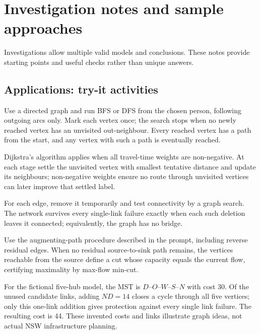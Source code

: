\chapter*{Investigation notes and sample approaches}
Investigations allow multiple valid models and conclusions. These notes provide starting points and useful checks rather than unique answers.

\section*{Applications: try-it activities}
\begin{description}[style=nextline]
\item[Social networks] Use a directed graph and run BFS or DFS from the chosen person, following outgoing arcs only. Mark each vertex once; the search stops when no newly reached vertex has an unvisited out-neighbour. Every reached vertex has a path from the start, and any vertex with such a path is eventually reached.
\item[Transport networks] Dijkstra's algorithm applies when all travel-time weights are non-negative. At each stage settle the unvisited vertex with smallest tentative distance and update its neighbours; non-negative weights ensure no route through unvisited vertices can later improve that settled label.
\item[Telecommunication networks] For each edge, remove it temporarily and test connectivity by a graph search. The network survives every single-link failure exactly when each such deletion leaves it connected; equivalently, the graph has no bridge.
\item[Computer networks] Use the augmenting-path procedure described in the prompt, including reverse residual edges. When no residual source-to-sink path remains, the vertices reachable from the source define a cut whose capacity equals the current flow, certifying maximality by max-flow min-cut.
\item[NSW-inspired electricity links] For the fictional five-hub model, the MST is $D$--$O$--$W$--$S$--$N$ with cost 30. Of the unused candidate links, adding $ND=14$ closes a cycle through all five vertices; only this one-link addition gives protection against every single link failure. The resulting cost is 44. These invented costs and links illustrate graph ideas, not actual NSW infrastructure planning.
\end{description}

